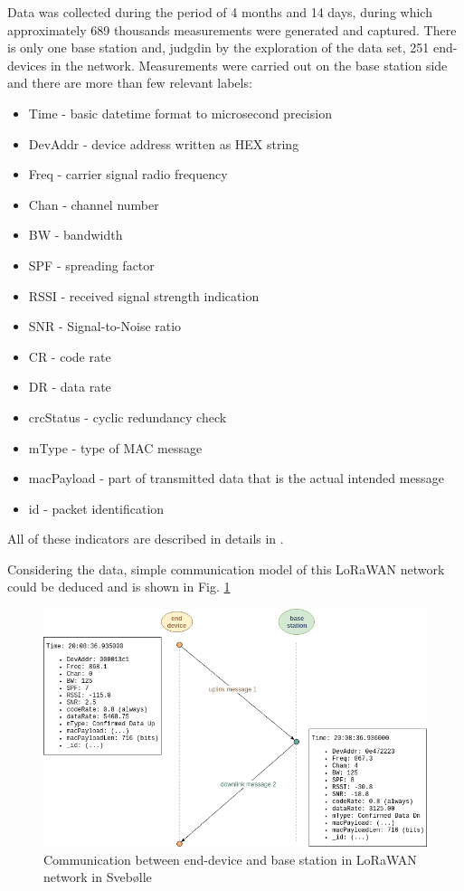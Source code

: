 \documentclass[11pt, a4paper]{article} %
\begin{document}
Data was collected during the period of 4 months and 14 days, during which approximately 689 thousands measurements were generated and captured. 
There is only one base station and, judgdin by the exploration of the data set, 251 end-devices in the network.
Measurements were carried out on the base station side and there are more than few relevant labels:
\begin{itemize}
	\item Time - basic datetime format to microsecond precision
    \item DevAddr - device address written as HEX string
    \item Freq - carrier signal radio frequency
    \item Chan - channel number
    \item BW - bandwidth
    \item SPF - spreading factor
    \item RSSI - received signal strength indication
    \item SNR - Signal-to-Noise ratio
    \item CR - code rate 
    \item DR - data rate
    \item crcStatus - cyclic redundancy check
    \item mType - type of MAC message
    \item macPayload - part of transmitted data that is the actual intended message
    \item id - packet identification
\end{itemize}

All of these indicators are described in details in \cite{Aloys_LoRa}.

Considering the data, simple communication model of this LoRaWAN network could be deduced and is shown in Fig. \ref{communication}
\begin{figure}
	\centering
	\includegraphics[scale=.5]{images/Svebolle-ed-bs-model.png} %
	\caption{Communication between end-device and base station in LoRaWAN network in Svebølle} %
	\label{communication} 
\end{figure}
\end{document}
